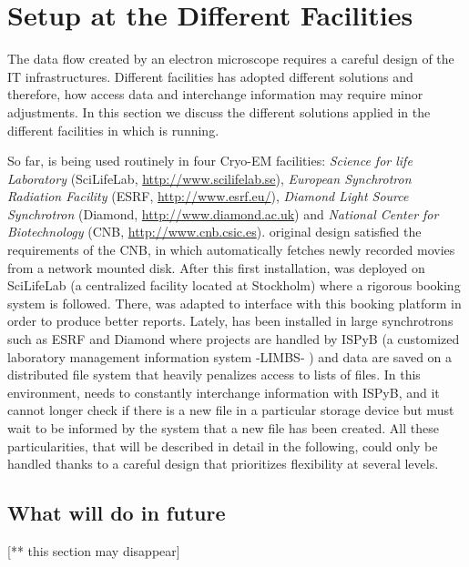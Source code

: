 \section{\scipion Setup at the Different Facilities}

The data flow created by an electron microscope requires a careful design of the IT infrastructures.  Different facilities has adopted different solutions and therefore, how \scipion  access data and interchange information may require minor adjustments. In this section we discuss  the different solutions applied in the different facilities in which \scipion is running.

So far, \scipion is being used routinely in four Cryo-EM facilities: \emph{Science for life Laboratory} (SciLifeLab, \url{http://www.scilifelab.se}),  \emph{European Synchrotron Radiation Facility} (ESRF, \url{http://www.esrf.eu/}), \emph{Diamond Light Source Synchrotron} (Diamond, \url{http://www.diamond.ac.uk}) and \emph{National Center for Biotechnology} (CNB, \url{http://www.cnb.csic.es}). \scipion original design satisfied the requirements of the CNB, in which \scipion automatically fetches newly recorded movies from a network mounted disk. After this first installation, \scipion was deployed on SciLifeLab (a centralized facility located at Stockholm) where a rigorous booking system is followed. There, \scipion was adapted to interface with this booking platform in order to produce better reports. Lately,  \scipion has been installed in  large synchrotrons  such as ESRF and Diamond  where projects are handled by ISPyB (a customized laboratory management information system -LIMBS- \citep{Delageniere2011}) and data are saved on a distributed file system that heavily penalizes access to lists of files. In this environment, \scipion needs to constantly interchange information with ISPyB, and it cannot longer check if there is a new file in a particular storage device but must wait to be informed by the system that a new file has been created. All these particularities, that will be described in detail in the following, could only be handled thanks to a careful design that prioritizes flexibility at several levels. 







\subsection{What will do in future}
[** this section may disappear] 


